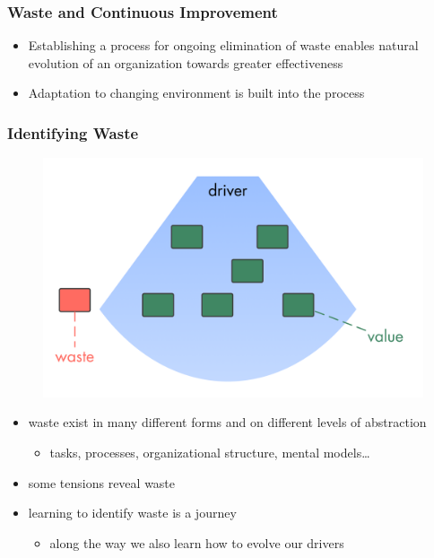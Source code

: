 \subsubsection{Waste and Continuous Improvement}
\label{wasteandcontinuousimprovement}

\begin{itemize}
\item Establishing a process for ongoing elimination of waste enables natural evolution of an organization towards greater effectiveness

\item Adaptation to changing environment is built into the process

\end{itemize}

\subsubsection{Identifying Waste}
\label{identifyingwaste}

\begin{figure}[htbp]
\centering
\includegraphics[keepaspectratio,width=\textwidth,height=0.75\textheight]{img/evolution/drivers-value-waste.png}
\end{figure}

\begin{itemize}
\item waste exist in many different forms and on different levels of abstraction

\begin{itemize}
\item tasks, processes, organizational structure, mental models{\ldots}

\end{itemize}

\item some tensions reveal waste

\item learning to identify waste is a journey

\begin{itemize}
\item along the way we also learn how to evolve our drivers

\end{itemize}

\end{itemize}

